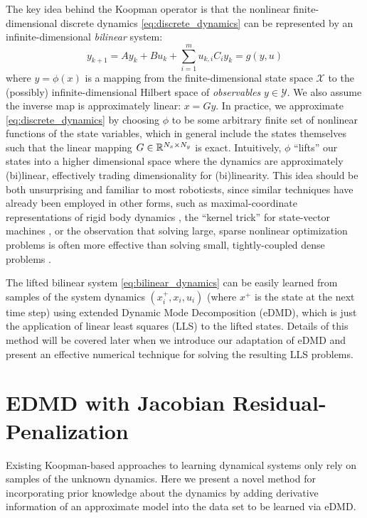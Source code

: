 \documentclass{article}
\begin{document}
  The key idea behind the Koopman operator is that the nonlinear finite-dimensional discrete
  dynamics \eqref{eq:discrete_dynamics} can be represented by an infinite-dimensional
  \textit{bilinear} system:
  \begin{equation} \label{eq:bilinear_dynamics}
      y_{k+1} = A y_k + B u_k + \sum_{i=1}^m u_{k,i} C_i y_k = g(y,u)
  \end{equation}
  where $y = \phi(x)$ is a mapping from the finite-dimensional state space $\mathcal{X}$ to
  the (possibly) infinite-dimensional Hilbert space of \textit{observables} $y \in
  \mathcal{Y}$. We also assume the inverse map is approximately linear: $x = G y$. In
  practice, we approximate \eqref{eq:discrete_dynamics} by choosing $\phi$ to be some
  arbitrary finite set of nonlinear functions of the state variables, which in general
  include the states themselves such that the linear mapping $G \in \mathbb{R}^{N_x \times N_y}$ is
  exact.  Intuitively, $\phi$ ``lifts'' our states into a higher dimensional space where the
  dynamics are approximately (bi)linear, effectively trading dimensionality for
  (bi)linearity. This idea should be both unsurprising and familiar to most roboticsts,
  since similar techniques have already been employed in other forms, such as
  maximal-coordinate representations of rigid body dynamics , the
  ``kernel trick'' for state-vector machines , or the observation that
  solving large, sparse nonlinear optimization problems is often more effective than solving
  small, tightly-coupled dense problems .

  The lifted bilinear system \eqref{eq:bilinear_dynamics} can be easily learned from samples
  of the system dynamics $(x_i^+,x_i,u_i)$ (where $x^+$ is the state at the next time step)
  using extended Dynamic Mode Decomposition (eDMD), which is just the application of linear
  least squares (LLS) to the lifted states.  Details of this method will be covered later
  when we introduce our adaptation of eDMD and present an effective numerical technique for
  solving the resulting LLS problems.

\section{EDMD with Jacobian Residual-Penalization} \label{sec:methodology}
  Existing Koopman-based approaches to learning dynamical systems only rely on samples of
  the unknown dynamics. Here we present a novel method for incorporating prior knowledge
  about the dynamics by adding derivative information of an approximate model into the data
  set to be learned via eDMD.
\end{document}
